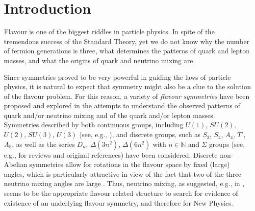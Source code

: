 \documentclass[11pt,a4paper]{article}
\numberwithin{equation}{section}
\begin{document}
\section{Introduction}
\label{sec:intro}

 Flavour is one of the biggest riddles in particle physics. 
In spite of the tremendous success of the Standard Theory, 
yet we do not know why the number of fermion generations is three, 
what determines the patterns of quark and lepton masses, 
and what the origins of quark and neutrino mixing are. 

  Since symmetries proved to be very powerful in guiding the laws 
of particle physics, it is natural to expect that 
symmetry might also be a clue to the 
solution of the flavour problem. 
For this reason, a variety of  \textit{flavour symmetries} 
have been proposed and explored 
in the attempts to understand the observed patterns 
of quark and/or neutrino mixing and of the 
quark and/or lepton masses.  
Symmetries described by both continuous groups, 
including $U(1)$, $SU(2)$, $U(2)$, $SU(3)$, $U(3)$ 
(see, e.g., \cite{Froggatt:1978nt,Barbieri:1996ae,Barbieri:1996ww,
Barbieri:1997tu,Petcov:1982ya,King:2003rf}), 
and discrete groups, such as $S_3$, $S_4$, $A_4$, $T'$, $A_5$, 
as well as the series $D_n$, $\Delta(3n^2)$, $\Delta(6n^2)$ 
with $n \in \mathbb{N}$ and $\Sigma$ groups 
(see, e.g., \cite{Altarelli:2010gt,Ishimori:2010au,King:2013eh} 
for reviews and original references) have been considered.
Discrete non-Abelian symmetries allow for rotations in the flavour space 
by fixed (large) angles, which is particularly attractive in view 
of the fact that two of the three neutrino mixing angles are large 
\cite{Esteban:2016qun,Capozzi:2017ipn,deSalas:2017kay}. 
Thus, neutrino mixing, as suggested, e.g., in \cite{Lam:2008rs},  
seems to be the appropriate flavour related structure 
to search for evidence of existence of an underlying flavour symmetry, 
and therefore for New Physics.
\end{document}
